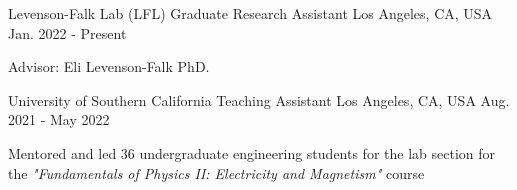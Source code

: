 
\begin{cventries}

    \cventry
    {Levenson-Falk Lab (LFL)}
    {Graduate Research Assistant}
    {Los Angeles, CA, USA}
    {Jan. 2022 - Present}
    {
        \begin{cvitems}
        \item{Advisor: Eli Levenson-Falk PhD.}
        \end{cvitems}
        \vspace{1em}
    }


    \cventry
    {University of Southern California}
    {Teaching Assistant}
    {Los Angeles, CA, USA}
    {Aug. 2021 - May 2022}
    {
        \begin{cvitems}
        \item{Mentored and led 36 undergraduate engineering students for the lab section for the \textit{"Fundamentals of Physics II: Electricity and Magnetism"} course}
        \end{cvitems}
        \vspace{1em}
    }



\end{cventries}
